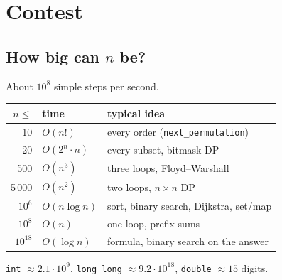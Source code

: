 \section{Contest}

\subsection{How big can $n$ be?}
About $10^8$ simple steps per second.\par
\begin{tabularx}{\linewidth}{@{}rlX@{}}
\toprule
$n \le$ & time & typical idea\\
\midrule
10 & $O(n!)$ & every order (\texttt{next\_permutation})\\
20 & $O(2^n \cdot n)$ & every subset, bitmask DP\\
500 & $O(n^3)$ & three loops, Floyd--Warshall\\
5\,000 & $O(n^2)$ & two loops, $n \times n$ DP\\
$10^6$ & $O(n \log n)$ & sort, binary search, Dijkstra, set/map\\
$10^8$ & $O(n)$ & one loop, prefix sums\\
$10^{18}$ & $O(\log n)$ & formula, binary search on the answer\\
\bottomrule
\end{tabularx}\par
\texttt{int} $\approx 2.1\cdot10^9$, \texttt{long long} $\approx 9.2\cdot10^{18}$,
\texttt{double} $\approx 15$ digits.

